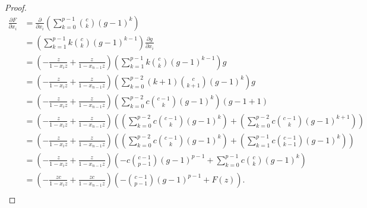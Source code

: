 \documentclass{article}
\numberwithin{equation}{section}
\begin{document}
\begin{proof}
\begin{align*}
\frac{\partial F}{\partial x_i}&=\frac{\partial}{\partial x_i}\left(\sum_{k=0}^{p-1} \binom{c}{k} (g-1)^k\right)\\
&=\left(\sum_{k=1}^{p-1}k\binom{c}{k}(g-1)^{k-1}\right)\frac{\partial g}{\partial x_i}\\
&=\left(-\frac{z}{1-x_iz}+\frac{z}{1-x_{n-1}z}\right)\left(\sum_{k=1}^{p-1}k\binom{c}{k}(g-1)^{k-1}\right)g\\
&=\left(-\frac{z}{1-x_iz}+\frac{z}{1-x_{n-1}z}\right)\left(\sum_{k=0}^{p-2}(k+1)\binom{c}{k+1}(g-1)^{k}\right)g\\
&=\left(-\frac{z}{1-x_iz}+\frac{z}{1-x_{n-1}z}\right)\left(\sum_{k=0}^{p-2}c\binom{c-1}{k}(g-1)^{k}\right)(g-1+1)\\
&=\left(-\frac{z}{1-x_iz}+\frac{z}{1-x_{n-1}z}\right)\left(\left(\sum_{k=0}^{p-2}c\binom{c-1}{k}(g-1)^{k}\right)+\left(\sum_{k=0}^{p-2}c\binom{c-1}{k}(g-1)^{k+1}\right)\right)\\
&=\left(-\frac{z}{1-x_iz}+\frac{z}{1-x_{n-1}z}\right)\left(\left(\sum_{k=0}^{p-2}c\binom{c-1}{k}(g-1)^{k}\right)+\left(\sum_{k=1}^{p-1}c\binom{c-1}{k-1}(g-1)^{k}\right)\right)\\
&=\left(-\frac{z}{1-x_iz}+\frac{z}{1-x_{n-1}z}\right)\left(-c\binom{c-1}{p-1}(g-1)^{p-1}+\sum_{k=0}^{p-1}c\binom{c}{k}(g-1)^{k}\right)\\
&=\left(-\frac{zc}{1-x_iz}+\frac{zc}{1-x_{n-1}z}\right)\left(-\binom{c-1}{p-1}(g-1)^{p-1}+F(z)\right).\\
\end{align*}
%

\end{proof}
\end{document}
